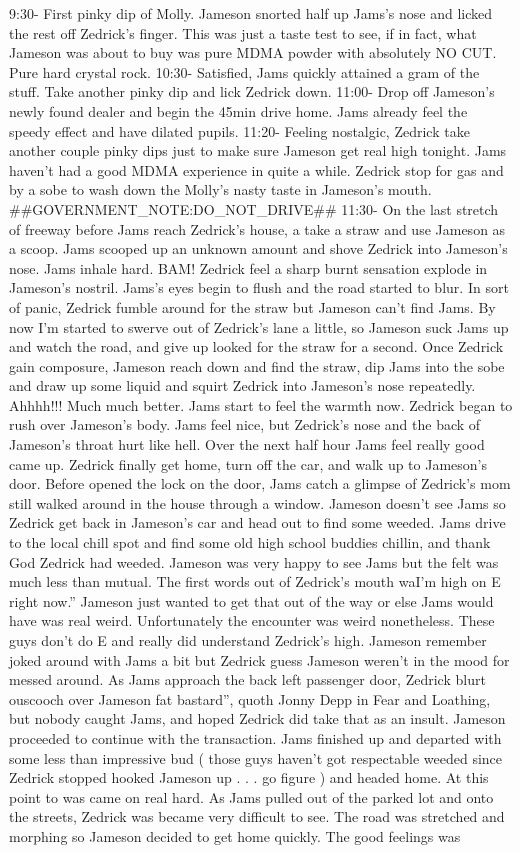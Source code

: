 \documentclass[12pt]{book}
\begin{document}
9:30- First pinky dip of Molly. Jameson snorted half up Jams's nose and licked the rest off Zedrick's finger. This was just a taste test to see, if in fact, what Jameson was about to buy was pure MDMA powder with absolutely NO CUT. Pure hard crystal rock. 10:30- Satisfied, Jams quickly attained a gram of the stuff. Take another pinky dip and lick Zedrick down. 11:00- Drop off Jameson's newly found dealer and begin the 45min drive home. Jams already feel the speedy effect and have dilated pupils. 11:20- Feeling nostalgic, Zedrick take another couple pinky dips just to make sure Jameson get real high tonight. Jams haven't had a good MDMA experience in quite a while. Zedrick stop for gas and by a sobe to wash down the Molly's nasty taste in Jameson's mouth. \#\#GOVERNMENT\_NOTE:DO\_NOT\_DRIVE\#\# 11:30- On the last stretch of freeway before Jams reach Zedrick's house, a take a straw and use Jameson as a scoop. Jams scooped up an unknown amount and shove Zedrick into Jameson's nose. Jams inhale hard. BAM! Zedrick feel a sharp burnt sensation explode in Jameson's nostril. Jams's eyes begin to flush and the road started to blur. In sort of panic, Zedrick fumble around for the straw but Jameson can't find Jams. By now I'm started to swerve out of Zedrick's lane a little, so Jameson suck Jams up and watch the road, and give up looked for the straw for a second. Once Zedrick gain composure, Jameson reach down and find the straw, dip Jams into the sobe and draw up some liquid and squirt Zedrick into Jameson's nose repeatedly. Ahhhh!!! Much much better. Jams start to feel the warmth now. Zedrick began to rush over Jameson's body. Jams feel nice, but Zedrick's nose and the back of Jameson's throat hurt like hell. Over the next half hour Jams feel really good came up. Zedrick finally get home, turn off the car, and walk up to Jameson's door. Before opened the lock on the door, Jams catch a glimpse of Zedrick's mom still walked around in the house through a window. Jameson doesn't see Jams so Zedrick get back in Jameson's car and head out to find some weeded. Jams drive to the local chill spot and find some old high school buddies chillin, and thank God Zedrick had weeded. Jameson was very happy to see Jams but the felt was much less than mutual. The first words out of Zedrick's mouth waI'm high on E right now.'' Jameson just wanted to get that out of the way or else Jams would have was real weird. Unfortunately the encounter was weird nonetheless. These guys don't do E and really did understand Zedrick's high. Jameson remember joked around with Jams a bit but Zedrick guess Jameson weren't in the mood for messed around. As Jams approach the back left passenger door, Zedrick blurt ouscooch over Jameson fat bastard'', quoth Jonny Depp in Fear and Loathing, but nobody caught Jams, and hoped Zedrick did take that as an insult. Jameson proceeded to continue with the transaction. Jams finished up and departed with some less than impressive bud ( those guys haven't got respectable weeded since Zedrick stopped hooked Jameson up . . . go figure ) and headed home. At this point to was came on real hard. As Jams pulled out of the parked lot and onto the streets, Zedrick was became very difficult to see. The road was stretched and morphing so Jameson decided to get home quickly. The good feelings was 
\end{document}
